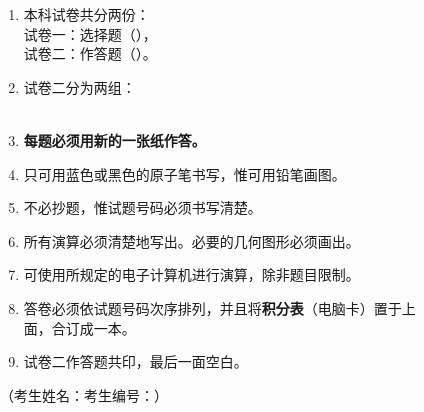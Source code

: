 \documentclass[12pt,a4paper]{exam-zh}
\newcommand{\ulinefill}[1]{\underline{\hspace{#1}}}
\begin{document}
\begin{enumerate}[label=（\arabic*）,leftmargin=2.8em,itemsep=0.38em]
  \item 本科试卷共分两份：\\
  \hspace*{1.3em}试卷一：选择题（\paperonepercentage），\\
  \hspace*{1.3em}试卷二：作答题（\papertwopercentage）。
    
  \item
  试卷二分为两组：\\
  \hspace*{1.3em}\textbf{\requiredgroupnotice}\\

  \item \textbf{每题必须用新的一张纸作答。}

  \item 只可用蓝色或黑色的原子笔书写，惟可用铅笔画图。

  \item 不必抄题，惟试题号码必须书写清楚。

  \item 所有演算必须清楚地写出。必要的几何图形必须画出。

  \item 可使用所规定的电子计算机进行演算，除非题目限制。

  \item 答卷必须依试题号码次序排列，并且将\textbf{积分表}（电脑卡）置于上\\
  面，合订成一本。

  \item 试卷二作答题共印\questionpages，最后一面空白。
\end{enumerate}

\vspace{1.0em}

\begin{center}
  \fbox{\rule{0pt}{1.15em}\hspace{1.2em}{\bfseries 未经正式宣布\quad 不得翻看内页}\hspace{1.2em}}
\end{center}

\vspace{1.2em}

\noindent
（考生姓名：\ulinefill{4.4cm}\hfill 考生编号：\ulinefill{4.3cm}）


\newpage
\end{document}
